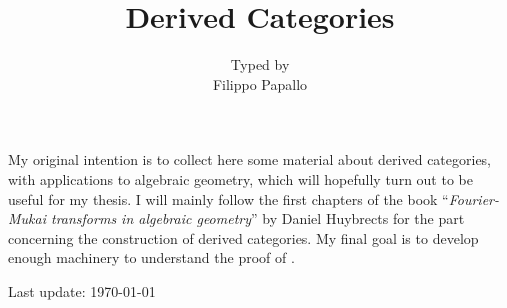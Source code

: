 \documentclass[a4paper, 10pt, oneside, DIV=9, chapterprefix=true, numbers=enddot,bibliography=totoc]{scrbook}
\title{Derived Categories}
\author{ }
\date{{\normalsize Typed by}\\
	Filippo Papallo}
\begin{document}
\setlength{\parindent}{0pt}
\setlength{\parskip}{4pt}

\frontmatter
{}
\renewcommand{\thedummy}{\arabic{dummy}}
\maketitle

My original intention is to collect here some 
material about derived categories, with applications to
algebraic geometry, which will hopefully turn out to be 
useful for my thesis.
I will mainly follow the first chapters of the book
``\textit{Fourier-Mukai transforms in algebraic geometry}''
by Daniel Huybrects \parencite[]{huybrechts} for the part concerning
the construction of derived categories.
My final goal is to develop enough machinery to
understand the proof of \parencite[Lemma~2.18]{seidel-thomas}.

\hrulefill

Last update: \today
	
	


\tableofcontents

	\listoftodos

\setcounter{llecture}{0}
\mainmatter{}
\renewcommand{\thedummy}{\thechapter.\arabic{dummy}}
\renewcommand{\thechapter}{\Roman{chapter}}





%
%	
%
\end{document}

